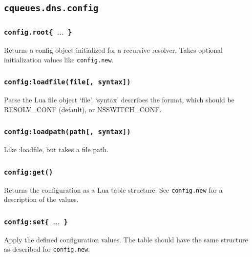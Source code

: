 \documentclass[11pt, oneside]{memoir}
\newcommand*{\fn}[1]{\texttt{#1}\xspace}
\newcounter{toccols}
\newenvironment{Module}[1]{
	\subsection{\texttt{#1}}
	\addtocontents{toc}{
		\protect\begin{multicols}{\value{toccols}}
	}
}{
	\addtocontents{toc}{\protect\end{multicols}}
}
\begin{document}
\begin{Module}{cqueues.dns.config}
\subsubsection[\fn{config.root}]{\fn{config.root\{ $\ldots$ \}}}

Returns a config object initialized for a recursive resolver. Takes optional initialization values like \fn{config.new}.

\subsubsection[\fn{config:loadfile}]{\fn{config:loadfile(file[, syntax])}}

Parse the Lua file object `file'. `syntax' describes the format, which should be RESOLV\_CONF (default), or NSSWITCH\_CONF.

\subsubsection[\fn{config:loadpath}]{\fn{config:loadpath(path[, syntax])}}

Like :loadfile, but takes a file path.

\subsubsection[\fn{config:get}]{\fn{config:get()}}

Returns the configuration as a Lua table structure. See \fn{config.new} for a description of the values.

\subsubsection[\fn{config:set}]{\fn{config:set\{ $\ldots$ \}}}

Apply the defined configuration values. The table should have the same structure as described for \fn{config.new}.

\end{Module}
\end{document}
